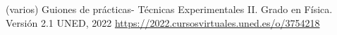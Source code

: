 \documentclass[a4paper,12pt,spanish]{article}
\begin{document}
\begin{thebibliography}{3}
	
	
	 (varios) Guiones de prácticas- Técnicas Experimentales II. Grado en Física. Versión 2.1  UNED, 2022 \url{https://2022.cursosvirtuales.uned.es/o/3754218}
	
	
\end{thebibliography}
\end{document}
